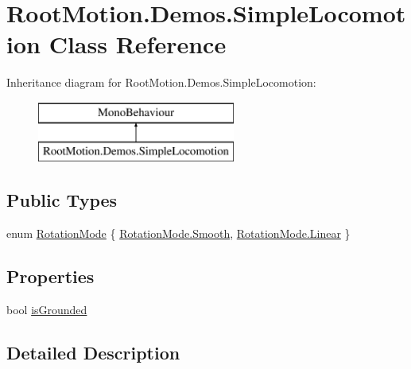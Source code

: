 \hypertarget{class_root_motion_1_1_demos_1_1_simple_locomotion}{}\section{Root\+Motion.\+Demos.\+Simple\+Locomotion Class Reference}
\label{class_root_motion_1_1_demos_1_1_simple_locomotion}
Inheritance diagram for Root\+Motion.\+Demos.\+Simple\+Locomotion\+:\begin{figure}[H]
\begin{center}
\leavevmode
\includegraphics[height=2.000000cm]{class_root_motion_1_1_demos_1_1_simple_locomotion}
\end{center}
\end{figure}
\subsection*{Public Types}
\begin{DoxyCompactItemize}
\item 
enum \mbox{\hyperlink{class_root_motion_1_1_demos_1_1_simple_locomotion_a412f3e00fd093f4158feda328cbc0308}{Rotation\+Mode}} \{ \mbox{\hyperlink{class_root_motion_1_1_demos_1_1_simple_locomotion_a412f3e00fd093f4158feda328cbc0308ae510cdf33cd497134b47b9316314d4b4}{Rotation\+Mode.\+Smooth}}, 
\mbox{\hyperlink{class_root_motion_1_1_demos_1_1_simple_locomotion_a412f3e00fd093f4158feda328cbc0308a32a843da6ea40ab3b17a3421ccdf671b}{Rotation\+Mode.\+Linear}}
 \}
\end{DoxyCompactItemize}
\subsection*{Properties}
\begin{DoxyCompactItemize}
\item 
bool \mbox{\hyperlink{class_root_motion_1_1_demos_1_1_simple_locomotion_abcfdfe85dfbf484514046a6de7d02cb3}{is\+Grounded}}
\end{DoxyCompactItemize}


\subsection{Detailed Description}


